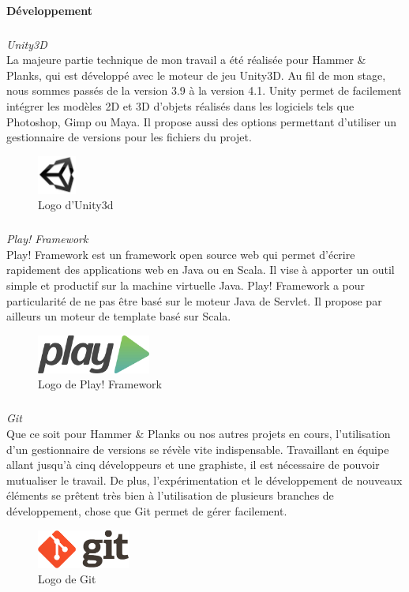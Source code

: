 		\paragraph{Développement}
		\subparagraph{} \emph{Unity3D\\}
La majeure partie technique de mon travail a été réalisée pour Hammer \& Planks, qui est développé avec le moteur de jeu Unity3D. Au fil de mon stage, nous sommes passés de la version 3.9 à la version 4.1. Unity permet de facilement intégrer les modèles 2D et 3D d'objets réalisés dans les logiciels tels que Photoshop, Gimp ou Maya. Il propose aussi des options permettant d'utiliser un gestionnaire de versions pour les fichiers du projet.
	\begin{figure}[!h]
		\centering
		\includegraphics[height=48px]{images/unity.jpg}
		\caption{Logo d'Unity3d}
		\label{logo_unity}
	\end{figure}

		\subparagraph{} \emph{Play! Framework\\}
Play! Framework est un framework open source web qui permet d'écrire rapidement des applications web en Java ou en Scala. Il vise à apporter un outil simple et productif sur la machine virtuelle Java. Play! Framework a pour particularité de ne pas être basé sur le moteur Java de Servlet. Il propose par ailleurs un moteur de template basé sur Scala.
	\begin{figure}[!h]
		\centering
		\includegraphics[height=48px]{images/play.png}
		\caption{Logo de Play! Framework}
		\label{logo_play}
	\end{figure}		

		\subparagraph{} \emph{Git\\}
Que ce soit pour Hammer \& Planks ou nos autres projets en cours, l'utilisation d'un gestionnaire de versions se révèle vite indispensable. Travaillant en équipe allant jusqu'à cinq développeurs et une graphiste, il est nécessaire de pouvoir mutualiser le travail. De plus, l'expérimentation et le développement de nouveaux éléments se prêtent très bien à l'utilisation de plusieurs branches de développement, chose que Git permet de gérer facilement.
	\begin{figure}[!h]
		\centering
		\includegraphics[height=48px]{images/git.png}
		\caption{Logo de Git}
		\label{logo_git}
	\end{figure}

